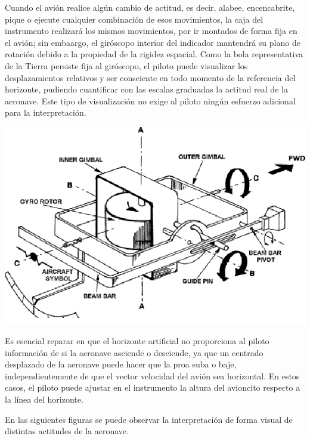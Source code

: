 \documentclass{article}
\begin{document}
Cuando el avión realice algún cambio de actitud, es decir, alabee, encencabrite, pique o ejecute cualquier combinación de esos movimientos, la caja del instrumento realizará los mismos movimientos, por ir montados de forma fija en el avión; sin embaargo, el giróscopo interior del indicador mantendrá su plano de rotación debido a la propiedad de la rigidez espacial. Como la bola representativa de la Tierra persiste fija al giróscopo, el piloto puede visualizar los desplazamientos relativos y ser consciente en todo momento de la referencia del horizonte, pudiendo cuantificar con las escalas graduadas la actitud real de la aeronave. Este tipo de visualización no exige al piloto ningún esfuerzo adicional para la interpretación.
\begin{center}
\includegraphics[scale=0.49]{figuras/horizonte-artificial-funcionamiento}
\label{fig:FAI}
\end{center}


Es esencial reparar en que el horizonte artificial no proporciona al piloto información de si la aeronave asciende o desciende, ya que un centrado desplazado de la aeronave puede hacer que la proa suba o baje, independientemente de que el vector velocidad del avión sea horizontal. En estos casos, el piloto puede ajustar en el instrumento la altura del avioncito respecto a la línea del horizonte.

En las siguientes figuras se puede observar la interpretación de forma visual de distintas actitudes de la aeronave.
\end{document}
